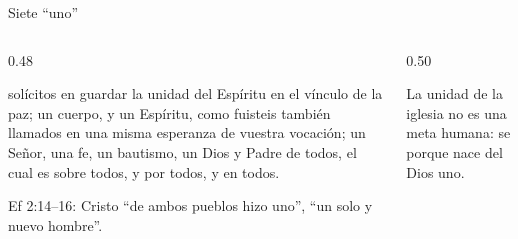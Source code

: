 \begin{frame}{Siete ``uno''}
\begin{columns}[c,onlytextwidth]
\begin{column}{0.48\textwidth}
\begin{cita}[fontupper=\scriptsize\itshape]solícitos en guardar la unidad del Espíritu en el vínculo de la paz; un cuerpo, y un Espíritu, como fuisteis también llamados en una misma esperanza de vuestra vocación; un Señor, una fe, un bautismo, un Dios y Padre de todos, el cual es sobre todos, y por todos, y en todos.\end{cita}
\scriptsize Ef 2:14--16: Cristo ``de ambos pueblos hizo uno'', ``un solo y nuevo hombre''.
\end{column}
\begin{column}{0.50\textwidth}
\centering
{}\par\smallskip
\small La unidad de la iglesia no es una meta humana: se  porque nace del Dios uno.
\end{column}
\end{columns}
\end{frame}

